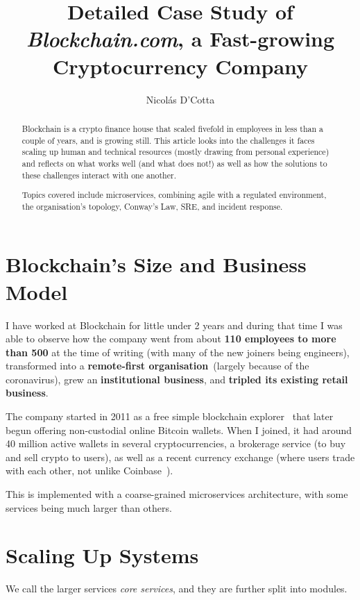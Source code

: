 \documentclass[conference]{IEEEtran}
\title{Detailed Case Study of \emph{Blockchain.com}, a Fast-growing Cryptocurrency Company}
\begin{document}
    \author{Nicolás D'Cotta}

    \maketitle

    \begin{abstract}
        Blockchain is a crypto finance house that scaled fivefold in
        employees in less than a couple of years, and is growing still.
        This article looks into the challenges it faces scaling up human and technical resources (mostly drawing from personal experience) and reflects on what works well (and what does not!) as well as how the solutions to these challenges interact with one another.

        Topics covered include microservices, combining agile with a regulated environment, the organisation's topology, Conway's Law, SRE, and incident response.
    \end{abstract}


    \section{Blockchain's Size and Business Model}\label{sec:business}

    I have worked at Blockchain for little under 2 years and during that time I was able to observe
    how the company went from about \textbf{110 employees to more than 500} at the time of writing (with many
    of the new joiners being engineers), transformed into a \textbf{remote-first organisation}~(largely because
    of the coronavirus), grew an \textbf{institutional business}, and \textbf{tripled its existing retail business}.

    The company started in 2011 as a free simple blockchain explorer~\cite{bcAbout} that later
    begun offering non-custodial online Bitcoin wallets.
    When I joined, it had around 40 million active wallets in several cryptocurrencies,
    a brokerage service (to buy and sell crypto to users), as well as a recent currency
    exchange (where users trade with each other, not unlike Coinbase~\cite{coinbasePro}).

    This is implemented with a coarse-grained microservices architecture, with some services
    being much larger than others.


    \section{Scaling Up Systems}
    We call the larger services \emph{core services}, and they are further split into modules.
\end{document}
